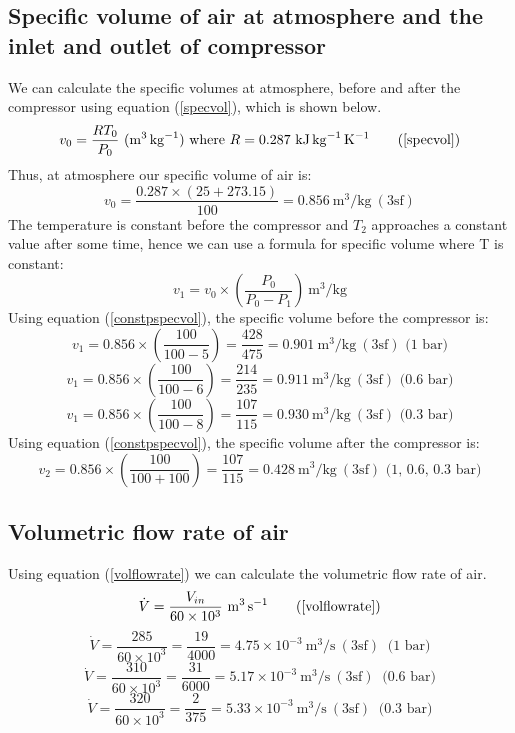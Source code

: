 \documentclass[class=article, crop=false, 12pt,a4paper]{standalone}
\begin{document}
\subsection{Specific volume of air at atmosphere and the inlet and outlet of compressor}
We can calculate the specific volumes at atmosphere, before and after the compressor using equation (\ref{specvol}), which is shown below.
\begin{equation}
  v_0 = \frac{RT_0}{P_0} \ (\si{\meter\cubed\per\kg}) \textrm{ where \(R = 0.287 \ \si{\kilo\joule\per\kg\per\kelvin}\)}
  \tag{\ref{specvol}}
\end{equation}
Thus, at atmosphere our specific volume of air is:
\[ v_0 = \frac{0.287 \times (25+273.15)}{100} = 0.856 \ \si{\meter\cubed\per\kg} \ (3\textrm{sf}) \]
The temperature is constant before the compressor and \(T_2\) approaches a constant value after some time, hence we can use a formula for specific volume where T is constant:
\begin{equation}
  v_1 = v_0 \times \left( \frac{P_0}{P_0 - P_1} \right) \ \si{\meter\cubed\per\kg}
  \label{constpspecvol}
\end{equation}
Using equation (\ref{constpspecvol}), the specific volume before the compressor is:
\[ v_1 = 0.856 \times \left( \frac{100}{100-5} \right) = \frac{428}{475} = 0.901 \ \si{\meter\cubed\per\kg} \ (3\textrm{sf}) \textrm{ (1 bar)} \]
\[ v_1 = 0.856 \times \left( \frac{100}{100-6} \right) = \frac{214}{235} = 0.911 \ \si{\meter\cubed\per\kg} \ (3\textrm{sf}) \textrm{ (0.6 bar)} \]
\[ v_1 = 0.856 \times \left( \frac{100}{100-8} \right) = \frac{107}{115} = 0.930 \ \si{\meter\cubed\per\kg} \ (3\textrm{sf}) \textrm{ (0.3 bar)} \]
Using equation (\ref{constpspecvol}), the specific volume after the compressor is:
\[ v_2 = 0.856 \times \left( \frac{100}{100+100} \right) = \frac{107}{115} = 0.428 \ \si{\meter\cubed\per\kg} \ (3\textrm{sf}) \textrm{ (1, 0.6, 0.3 bar)} \]
\subsection{Volumetric flow rate of air}
Using equation (\ref{volflowrate}) we can calculate the volumetric flow rate of air.
\begin{equation}
  \dot{V} = \frac{V_{in}}{60 \times 10^3} \ \si{\meter\cubed\per\second}
  \tag{\ref{volflowrate}}
\end{equation}
\[ \dot{V} = \frac{285}{60\times 10^3} = \frac{19}{4000} = 4.75 \times 10^{-3} \ \si{\meter\cubed\per\second} \ (3\textrm{sf}) \ \textrm{ (1 bar)}\]
\[ \dot{V} = \frac{310}{60\times 10^3} = \frac{31}{6000} = 5.17 \times 10^{-3} \ \si{\meter\cubed\per\second} \ (3\textrm{sf}) \ \textrm{ (0.6 bar)}\]
\[ \dot{V} = \frac{320}{60\times 10^3} = \frac{2}{375} = 5.33 \times 10^{-3} \ \si{\meter\cubed\per\second} \ (3\textrm{sf}) \ \textrm{ (0.3 bar)}\]
\end{document}
